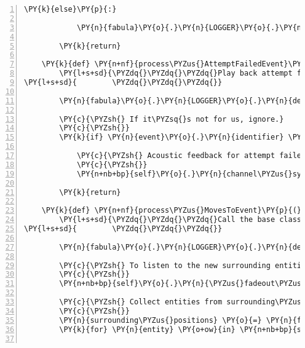 \begin{Verbatim}[commandchars=\\\{\},numbers=left,firstnumber=1,stepnumber=1]
        \PY{k}{else}\PY{p}{:}

            \PY{n}{fabula}\PY{o}{.}\PY{n}{LOGGER}\PY{o}{.}\PY{n}{warning}\PY{p}{(}\PY{l+s}{\PYZdq{}}\PY{l+s}{perception for }\PY{l+s}{\PYZsq{}}\PY{l+s}{\PYZob{}\PYZcb{}}\PY{l+s}{\PYZsq{}}\PY{l+s}{, not read out}\PY{l+s}{\PYZdq{}}\PY{o}{.}\PY{n}{format}\PY{p}{(}\PY{n}{event}\PY{o}{.}\PY{n}{identifier}\PY{p}{)}\PY{p}{)}

        \PY{k}{return}

    \PY{k}{def} \PY{n+nf}{process\PYZus{}AttemptFailedEvent}\PY{p}{(}\PY{n+nb+bp}{self}\PY{p}{,} \PY{n}{event}\PY{p}{)}\PY{p}{:}
        \PY{l+s+sd}{\PYZdq{}\PYZdq{}\PYZdq{}Play back attempt failed sound.}
\PY{l+s+sd}{        \PYZdq{}\PYZdq{}\PYZdq{}}

        \PY{n}{fabula}\PY{o}{.}\PY{n}{LOGGER}\PY{o}{.}\PY{n}{debug}\PY{p}{(}\PY{l+s}{\PYZdq{}}\PY{l+s}{called}\PY{l+s}{\PYZdq{}}\PY{p}{)}

        \PY{c}{\PYZsh{} If it\PYZsq{}s not for us, ignore.}
        \PY{c}{\PYZsh{}}
        \PY{k}{if} \PY{n}{event}\PY{o}{.}\PY{n}{identifier} \PY{o}{==} \PY{n+nb+bp}{self}\PY{o}{.}\PY{n}{host}\PY{o}{.}\PY{n}{client\PYZus{}id}\PY{p}{:}

            \PY{c}{\PYZsh{} Acoustic feedback for attempt failed}
            \PY{c}{\PYZsh{}}
            \PY{n+nb+bp}{self}\PY{o}{.}\PY{n}{channel\PYZus{}system}\PY{o}{.}\PY{n}{play}\PY{p}{(}\PY{n+nb+bp}{self}\PY{o}{.}\PY{n}{attempt\PYZus{}failed\PYZus{}sound}\PY{p}{)}

        \PY{k}{return}

    \PY{k}{def} \PY{n+nf}{process\PYZus{}MovesToEvent}\PY{p}{(}\PY{n+nb+bp}{self}\PY{p}{,} \PY{n}{event}\PY{p}{)}\PY{p}{:}
        \PY{l+s+sd}{\PYZdq{}\PYZdq{}\PYZdq{}Call the base class and make Entity\PYZsq{}s surrounding the new player position audible.}
\PY{l+s+sd}{        \PYZdq{}\PYZdq{}\PYZdq{}}

        \PY{n}{fabula}\PY{o}{.}\PY{n}{LOGGER}\PY{o}{.}\PY{n}{debug}\PY{p}{(}\PY{l+s}{\PYZdq{}}\PY{l+s}{called}\PY{l+s}{\PYZdq{}}\PY{p}{)}

        \PY{c}{\PYZsh{} To listen to the new surrounding entities, fade the old ones out}
        \PY{c}{\PYZsh{}}
        \PY{n+nb+bp}{self}\PY{o}{.}\PY{n}{\PYZus{}fadeout\PYZus{}sound\PYZus{}surrounding\PYZus{}entities}\PY{p}{(}\PY{p}{)}

        \PY{c}{\PYZsh{} Collect entities from surrounding\PYZus{}positions}
        \PY{c}{\PYZsh{}}
        \PY{n}{surrounding\PYZus{}positions} \PY{o}{=} \PY{n}{fabula}\PY{o}{.}\PY{n}{surrounding\PYZus{}positions}\PY{p}{(}\PY{n+nb+bp}{self}\PY{o}{.}\PY{n}{host}\PY{o}{.}\PY{n}{room}\PY{o}{.}\PY{n}{entity\PYZus{}locations}\PY{p}{[}\PY{n+nb+bp}{self}\PY{o}{.}\PY{n}{host}\PY{o}{.}\PY{n}{client\PYZus{}id}\PY{p}{]}\PY{p}{)}
        \PY{k}{for} \PY{n}{entity} \PY{o+ow}{in} \PY{n+nb+bp}{self}\PY{o}{.}\PY{n}{host}\PY{o}{.}\PY{n}{room}\PY{o}{.}\PY{n}{entity\PYZus{}dict}\PY{o}{.}\PY{n}{values}\PY{p}{(}\PY{p}{)}\PY{p}{:}


\end{Verbatim}
